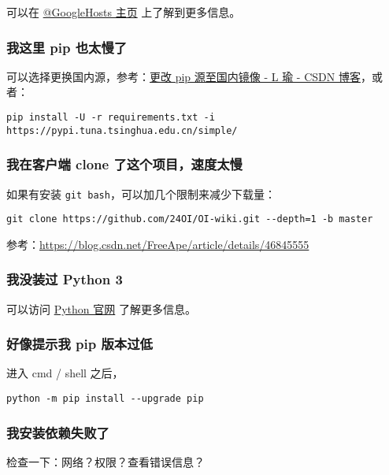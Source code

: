 可以在 \href{https://github.com/googlehosts/hosts}{@GoogleHosts 主页} 上了解到更多信息。

\subsubsection{我这里 pip 也太慢了}

可以选择更换国内源，参考：\href{https://blog.csdn.net/lambert310/article/details/52412059}{更改 pip 源至国内镜像 - L 瑜 - CSDN 博客}，或者：

\begin{verbatim}
pip install -U -r requirements.txt -i https://pypi.tuna.tsinghua.edu.cn/simple/
\end{verbatim}

\subsubsection{我在客户端 clone 了这个项目，速度太慢}

如果有安装 \texttt{git bash}，可以加几个限制来减少下载量：

\begin{verbatim}
git clone https://github.com/24OI/OI-wiki.git --depth=1 -b master
\end{verbatim}

参考：\url{https://blog.csdn.net/FreeApe/article/details/46845555}

\subsubsection{我没装过 Python 3}

可以访问 \href{https://www.python.org/downloads/}{Python 官网} 了解更多信息。

\subsubsection{好像提示我 pip 版本过低}

进入 cmd / shell 之后，

\begin{verbatim}
python -m pip install --upgrade pip
\end{verbatim}

\subsubsection{我安装依赖失败了}

检查一下：网络？权限？查看错误信息？

